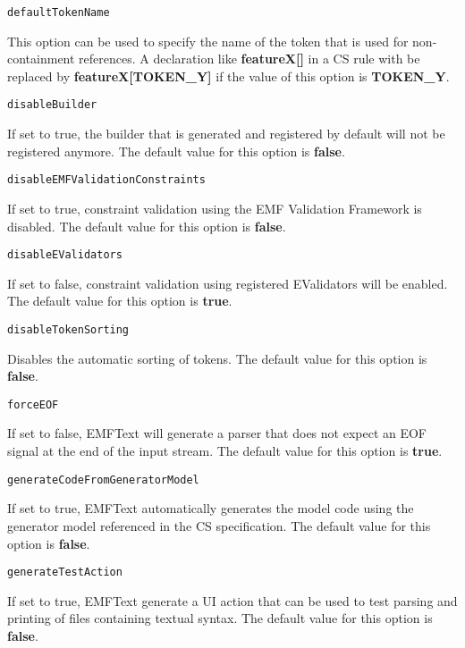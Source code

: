 \noindent\texttt{defaultTokenName}
\begin{myindentpar}{1cm}
This option can be used to specify the name of the token that is used for non-containment references. A declaration like \textbf{featureX[]} in a CS rule with be replaced by \textbf{featureX[TOKEN\_Y]} if the value of this option is \textbf{TOKEN\_Y}.
\end{myindentpar}

\noindent\texttt{disableBuilder}
\begin{myindentpar}{1cm}
If set to true, the builder that is generated and registered by default will not be registered anymore. The default value for this option is \textbf{false}.
\end{myindentpar}

\noindent\texttt{disableEMFValidationConstraints}
\begin{myindentpar}{1cm}
If set to true, constraint validation using the EMF Validation Framework is disabled. The default value for this option is \textbf{false}.
\end{myindentpar}

\noindent\texttt{disableEValidators}
\begin{myindentpar}{1cm}
If set to false, constraint validation using registered EValidators will be enabled. The default value for this option is \textbf{true}.
\end{myindentpar}

\noindent\texttt{disableTokenSorting}
\begin{myindentpar}{1cm}
Disables the automatic sorting of tokens. The default value for this option is \textbf{false}.
\end{myindentpar}

\noindent\texttt{forceEOF}
\begin{myindentpar}{1cm}
If set to false, EMFText will generate a parser that does not expect an EOF signal at the end of the input stream. The default value for this option is \textbf{true}.
\end{myindentpar}

\noindent\texttt{generateCodeFromGeneratorModel}
\begin{myindentpar}{1cm}
If set to true, EMFText automatically generates the model code using the generator model referenced in the CS specification. The default value for this option is \textbf{false}.
\end{myindentpar}

\noindent\texttt{generateTestAction}
\begin{myindentpar}{1cm}
If set to true, EMFText generate a UI action that can be used to test parsing and printing of files containing textual syntax. The default value for this option is \textbf{false}.
\end{myindentpar}

